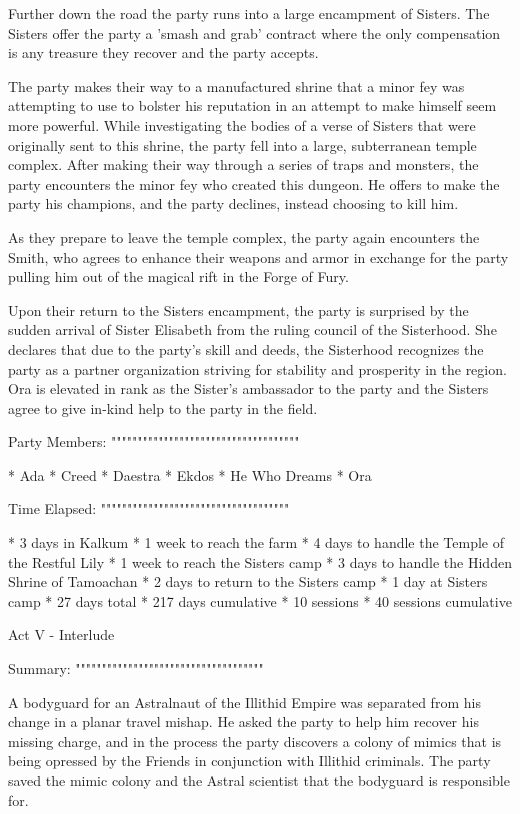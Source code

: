 Further down the road the party runs into a large encampment of Sisters.
The Sisters offer the party a 'smash and grab' contract where the only compensation is any treasure they recover and the party accepts.

The party makes their way to a manufactured shrine that a minor fey was attempting to use to bolster his reputation in an attempt to make himself seem more powerful.
While investigating the bodies of a verse of Sisters that were originally sent to this shrine, the party fell into a large, subterranean temple complex.
After making their way through a series of traps and monsters, the party encounters the minor fey who created this dungeon.
He offers to make the party his champions, and the party declines, instead choosing to kill him.

As they prepare to leave the temple complex, the party again encounters the Smith, who agrees to enhance their weapons and armor in exchange for the party pulling him out of the magical rift in the Forge of Fury.

Upon their return to the Sisters encampment, the party is surprised by the sudden arrival of Sister Elisabeth from the ruling council of the Sisterhood.
She declares that due to the party's skill and deeds, the Sisterhood recognizes the party as a partner organization striving for stability and prosperity in the region.
Ora is elevated in rank as the Sister's ambassador to the party and the Sisters agree to give in-kind help to the party in the field.

Party Members:
""""""""""""""""""""""""""""""""""""

  * Ada
  * Creed
  * Daestra
  * Ekdos
  * He Who Dreams
  * Ora

Time Elapsed:
""""""""""""""""""""""""""""""""""""

  * 3 days in Kalkum
  * 1 week to reach the farm
  * 4 days to handle the Temple of the Restful Lily
  * 1 week to reach the Sisters camp
  * 3 days to handle the Hidden Shrine of Tamoachan
  * 2 days to return to the Sisters camp
  * 1 day at Sisters camp
  * 27 days total
  * 217 days cumulative
  * 10 sessions
  * 40 sessions cumulative

Act V - Interlude
^^^^^^^^^^^^^^^^^^^^^^^^^^^^^^^^^^^^

Summary:
""""""""""""""""""""""""""""""""""""

A bodyguard for an Astralnaut of the Illithid Empire was separated from his change in a planar travel mishap.
He asked the party to help him recover his missing charge, and in the process the party discovers a colony of mimics that is being opressed by the Friends in conjunction with Illithid criminals.
The party saved the mimic colony and the Astral scientist that the bodyguard is responsible for.

